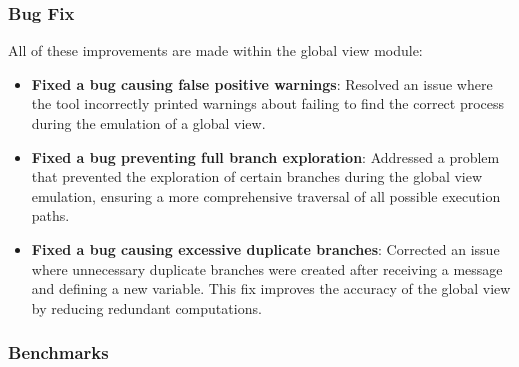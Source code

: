 \subsubsection{Bug Fix}
All of these improvements are made within the global view module:  
\begin{itemize}  
    \item \textbf{Fixed a bug causing false positive warnings}:  
    Resolved an issue where the tool incorrectly printed warnings about  
    failing to find the correct process during the emulation of a global view.  
    
    \item \textbf{Fixed a bug preventing full branch exploration}:  
    Addressed a problem that prevented the exploration of certain branches  
    during the global view emulation, ensuring a more comprehensive traversal  
    of all possible execution paths.  
    
    \item \textbf{Fixed a bug causing excessive duplicate branches}:  
    Corrected an issue where unnecessary duplicate branches were created  
    after receiving a message and defining a new variable. This fix improves  
    the accuracy of the global view by reducing redundant computations.  
\end{itemize}  


\subsubsection{Benchmarks}

